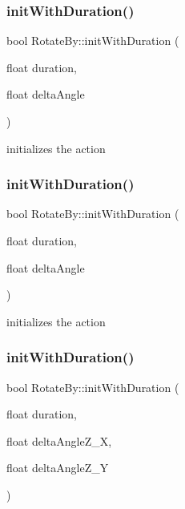 \subsubsection{\texorpdfstring{init\+With\+Duration()}{initWithDuration()}\hspace{0.1cm}{\footnotesize\ttfamily [1/4]}}
{\footnotesize\ttfamily bool Rotate\+By\+::init\+With\+Duration (\begin{DoxyParamCaption}\item[{float}]{duration,  }\item[{float}]{delta\+Angle }\end{DoxyParamCaption})}

initializes the action \mbox{\label{classRotateBy_a48df6f744dd4d505b2b78cbe599b8724}} 
\subsubsection{\texorpdfstring{init\+With\+Duration()}{initWithDuration()}\hspace{0.1cm}{\footnotesize\ttfamily [2/4]}}
{\footnotesize\ttfamily bool Rotate\+By\+::init\+With\+Duration (\begin{DoxyParamCaption}\item[{float}]{duration,  }\item[{float}]{delta\+Angle }\end{DoxyParamCaption})}

initializes the action \mbox{\label{classRotateBy_a68722de21a44b6efa8b85654c7ebd69c}} 
\subsubsection{\texorpdfstring{init\+With\+Duration()}{initWithDuration()}\hspace{0.1cm}{\footnotesize\ttfamily [3/4]}}
{\footnotesize\ttfamily bool Rotate\+By\+::init\+With\+Duration (\begin{DoxyParamCaption}\item[{float}]{duration,  }\item[{float}]{delta\+Angle\+Z\+\_\+X,  }\item[{float}]{delta\+Angle\+Z\+\_\+Y }\end{DoxyParamCaption})}

